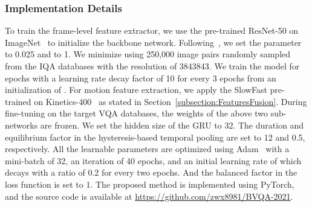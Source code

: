 \documentclass[journal]{IEEEtran}
\begin{document}
{{\subsubsection{Implementation Details}\label{subsec:Impldetail}
To train the frame-level feature extractor, we use the pre-trained ResNet-50 on ImageNet~\cite{deng2009imagenet} to initialize the backbone network. Following~\cite{zhang2021uncertainty}, we set the parameter  to 0.025 and  to 1. We minimize  using 250,000 image pairs randomly sampled from the IQA databases with the resolution of 3843843. We train the model for  epochs with a learning rate decay factor of 10 for every 3 epochs from an initialization of . For motion feature extraction, we apply the SlowFast pre-trained on Kinetics-400~\cite{kay2017kinetics} as stated in Section~\ref{subsection:FeaturesFusion}. During fine-tuning on the target VQA databases, the weights of the above two sub-networks are frozen. We set the hidden size of the GRU to 32. The duration  and equilibrium factor  in the hysteresis-based temporal pooling are set to 12 and 0.5, respectively. All the learnable parameters are optimized using Adam~\cite{Kingma2014adam} with a mini-batch of 32, an iteration of 40 epochs, and an initial learning rate of  which decays with a ratio of 0.2 for every two epochs. And the balanced factor  in the loss function is set to 1. The proposed method is implemented using PyTorch, and the source code is available at \url{https://github.com/zwx8981/BVQA-2021}.


}}
\end{document}
